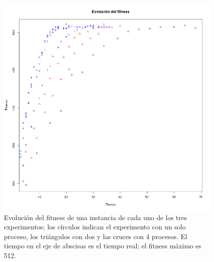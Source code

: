 \documentclass{article}
\begin{document}
%
\begin{figure}[!htb]
\centering
\includegraphics[scale=0.45]{evolucion-fitness.png}
\caption{Evolución del fitness de una instancia de cada uno de los
  tres experimentos; los círculos indican el experimento con un solo
  proceso, los triángulos con dos y las cruces con 4 procesos. El
  tiempo en el eje de abscisas es el tiempo real; el fitness máximo es
  512.  \label{fig:fit}}
\end{figure} 
\end{document}
